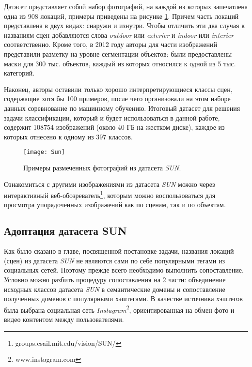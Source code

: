 \indent
Датасет представляет собой набор фотографий, на каждой из которых запечатлена
одна из 908 локаций, примеры приведены на рисунке \ref{tikzpicture: sun}. Причем
часть локаций представлена в двух
видах: снаружи и изнутри. Чтобы отличить эти два случая к названиям сцен добавляются слова \textit{outdoor} или \textit{exterier} и \textit{indoor} или \textit{interier} соответственно.
Кроме того, в 2012 году авторы для части изображений представили разметку 
на уровне сегментации объектов: были предоставлены маски для 300 тыс. объектов, каждый
из которых относился к одной из 5 тыс. категорий.

\indent
Наконец, авторы оставили только хорошо интерпретирующиеся классы сцен, 
содержащие хотя бы 100 примеров, после чего организовали на этом
наборе данных соревнование по машинному обучению. Итоговый датасет
для решения задачи классификации,
который и будет использоваться в данной работе,
содержит 108754 изображений (около 40 ГБ на жестком диске), каждое 
из которых отнесено к одному из 397 классов.

\begin{figure}[h]
    \begin{center}
   	    \texttt{[image: Sun]}
   	\end{center}
   	\caption{Примеры размеченных фотографий из датасета \textit{SUN}.}
   	\label{tikzpicture: sun}
\end{figure}

Ознакомиться с другими изображениями из датасета \textit{SUN} можно через 
интерактивный веб-обозреватель\footnote{groups.csail.mit.edu/vision/SUN/}, которым
можно воспользоваться для просмотра упорядоченных изображений как 
по сценам, так и по объектам.


\subsection{Адоптация датасета SUN}

\indent
\indent
Как было сказано в главе, посвященной постановке задачи,
 названия локаций (сцен) из датасета \textit{SUN} не 
являются сами по себе популярными тегами из социальных сетей. Поэтому 
прежде всего необходимо выполнить сопоставление. Условно можно
разбить процедуру сопоставления на 2 части: объединение исходных классов 
датасета \textit{SUN} в семантические домены и сопоставление полученных доменов
с популярными хэштегами. В качестве источника хэштегов была выбрана социальная
сеть \textit{Instagram}\footnote{www.instagram.com}, ориентированная на обмен фото
и видео контентом между пользователями.

